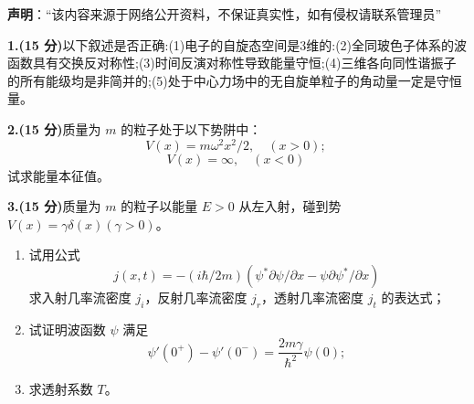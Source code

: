 
\textbf{声明}：“该内容来源于网络公开资料，不保证真实性，如有侵权请联系管理员”

\textbf{1.(15 分)}以下叙述是否正确:(1)电子的自旋态空间是3维的:(2)全同玻色子体系的波函数具有交换反对称性;(3)时间反演对称性导致能量守恒;(4)三维各向同性谐振子的所有能级均是非简并的;(5)处于中心力场中的无自旋单粒子的角动量一定是守恒量。

\textbf{2.(15 分)}质量为 $m$ 的粒子处于以下势阱中：
\[
V(x) = m \omega^2 x^2/2, \quad (x > 0);~
\]
\[
V(x) = \infty, \quad (x < 0)~
\]
试求能量本征值。

\textbf{3.(15 分)}质量为 $m$ 的粒子以能量 $E > 0$ 从左入射，碰到势 $V(x) = \gamma \delta(x) (\gamma > 0)$。

\begin{enumerate}
    \item 试用公式
    \[
    j(x,t) = -(i\hbar/2m)(\psi^* \partial \psi/\partial x - \psi \partial \psi^*/\partial x)~
    \]
    求入射几率流密度 $j_i$，反射几率流密度 $j_r$，透射几率流密度 $j_t$ 的表达式；
    
    \item 试证明波函数 $\psi$ 满足
    \[
    \psi'(0^+) - \psi'(0^-) = \frac{2m\gamma}{\hbar^2}\psi(0);~
    \]
    
    \item 求透射系数 $T$。
\end{enumerate}
